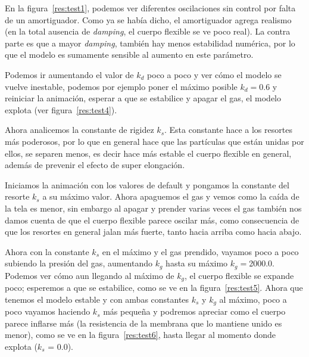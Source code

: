 En la figura~\ref{res:test1}, podemos ver diferentes oscilaciones sin control por falta de un amortiguador.
Como ya se había dicho, el amortiguador agrega realismo (en la total ausencia de \emph{\foreignlanguage{english}{damping}}, el cuerpo flexible se ve poco real). La contra parte es que a mayor \emph{\foreignlanguage{english}{damping}}, también hay menos estabilidad numérica, por lo que el modelo es sumamente sensible al aumento en este parámetro.

Podemos ir aumentando el valor de $k_d$ poco a poco y ver cómo el modelo se vuelve inestable, podemos por ejemplo poner el máximo posible $k_d=$0.6 y reiniciar la animación, esperar a que se estabilice y apagar el gas, el modelo explota (ver figura~\ref{res:test4}).

Ahora analicemos la constante de rigidez $k_s$.
Esta constante hace a los resortes más poderosos, por lo que en general hace que las partículas que están unidas por ellos, se separen menos, es decir hace más estable el cuerpo flexible en general, además de prevenir el efecto de super elongación.

Iniciamos la animación con los valores de default y pongamos la constante del resorte $k_s$ a su máximo valor.
Ahora apaguemos el gas y vemos como la caída de la tela es menor, sin embargo al apagar y prender varias veces el gas también nos damos cuenta de que el cuerpo flexible parece oscilar más, como consecuencia de que los resortes en general jalan más fuerte, tanto hacia arriba como hacia abajo.

Ahora con la constante $k_s$ en el máximo y el gas prendido, vayamos poco a poco subiendo la presión del gas, aumentando $k_g$ hasta su máximo $k_g=$2000.0. 
Podemos ver cómo aun llegando al máximo de $k_g$, el cuerpo flexible se expande poco; esperemos a que se estabilice, como se ve en la figura~\ref{res:test5}. 
Ahora que tenemos el modelo estable y con ambas constantes $k_s$ y $k_g$ al máximo, poco a poco vayamos haciendo $k_s$ más pequeña y podremos apreciar como el cuerpo parece inflarse más (la resistencia de la membrana que lo mantiene unido es menor), como se ve en la figura~\ref{res:test6}, hasta llegar al momento donde explota ($k_s$ = 0.0).

